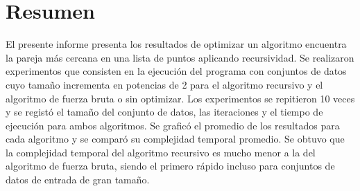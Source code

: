 \section{Resumen}
El presente informe presenta los resultados de optimizar un algoritmo encuentra la pareja más cercana en una lista de puntos aplicando recursividad. Se realizaron experimentos que consisten en la ejecución del programa con conjuntos de datos cuyo tamaño incrementa en potencias de 2 para el algoritmo recursivo y el algoritmo de fuerza bruta o sin optimizar. Los experimentos se repitieron 10 veces y se registó el tamaño del conjunto de datos, las iteraciones y el tiempo de ejecución para ambos algoritmos. Se graficó el promedio de los resultados para cada algoritmo y se comparó su complejidad temporal promedio. Se obtuvo que la complejidad temporal del algoritmo recursivo es mucho menor a la del algoritmo de fuerza bruta, siendo el primero rápido incluso para conjuntos de datos de entrada de gran tamaño.